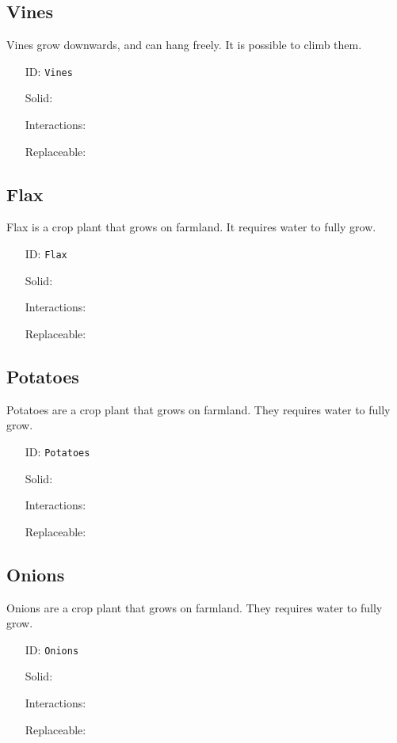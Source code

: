 \subsection{Vines}\label{subsec:blocks_vines}
Vines grow downwards, and can hang freely. It is possible to climb them.
\newline
\begin{itemize}[nosep]
    \item[ID:] \texttt{Vines}
    \item[Solid:]  \XSolidBrush \item[Interactions:]  \XSolidBrush \item[Replaceable:]  \XSolidBrush
\end{itemize}

\subsection{Flax}\label{subsec:blocks_flax}
Flax is a crop plant that grows on farmland. It requires water to fully grow.
\newline
\begin{itemize}[nosep]
    \item[ID:] \texttt{Flax}
    \item[Solid:]  \XSolidBrush \item[Interactions:]  \XSolidBrush \item[Replaceable:]  \XSolidBrush
\end{itemize}

\subsection{Potatoes}\label{subsec:blocks_potatoes}
Potatoes are a crop plant that grows on farmland. They requires water to fully grow.
\newline
\begin{itemize}[nosep]
    \item[ID:] \texttt{Potatoes}
    \item[Solid:]  \XSolidBrush \item[Interactions:]  \XSolidBrush \item[Replaceable:]  \XSolidBrush
\end{itemize}

\subsection{Onions}\label{subsec:blocks_onions}
Onions are a crop plant that grows on farmland. They requires water to fully grow.
\newline
\begin{itemize}[nosep]
    \item[ID:] \texttt{Onions}
    \item[Solid:]  \XSolidBrush \item[Interactions:]  \XSolidBrush \item[Replaceable:]  \XSolidBrush
\end{itemize}

